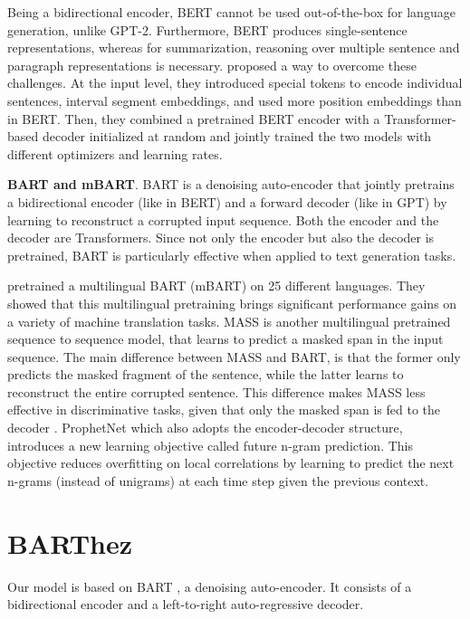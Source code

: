 \documentclass[11pt,a4paper]{article}
\begin{document}
Being a bidirectional encoder, BERT cannot be used out-of-the-box for language generation, unlike GPT-2.
Furthermore, BERT produces single-sentence representations, whereas for summarization, reasoning over multiple sentence and paragraph representations is necessary.
\citet{liu2019text} proposed a way to overcome these challenges.
At the input level, they introduced special tokens to encode individual sentences, interval segment embeddings, and used more position embeddings than in BERT.
Then, they combined a pretrained BERT encoder with a Transformer-based decoder initialized at random and jointly trained the two models with different optimizers and learning rates.

\noindent \textbf{BART and mBART}.
BART \cite{lewis2019bart} is a denoising auto-encoder that jointly pretrains a bidirectional encoder (like in BERT) and a forward decoder (like in GPT) by learning to reconstruct a corrupted input sequence.
Both the encoder and the decoder are Transformers.
Since not only the encoder but also the decoder is pretrained, BART is particularly effective when applied to text generation tasks.

\citet{liu2020multilingual} pretrained a multilingual BART (mBART) on 25 different languages.
They showed that this multilingual pretraining brings significant performance gains on a variety of machine translation tasks. 
MASS \cite{song2019mass} is another multilingual pretrained sequence to sequence model, that learns to predict a masked span in the input sequence.
The main difference between MASS and BART, is that the former only predicts the masked fragment of the sentence, while the latter learns to reconstruct the entire corrupted sentence.
This difference makes MASS less effective in discriminative tasks, given that only the masked span is fed to the decoder \cite{lewis2019bart}.
ProphetNet \cite{yan2020prophetnet} which also adopts the encoder-decoder structure, introduces a new learning objective called future n-gram prediction. This objective reduces overfitting on local correlations by learning to predict the next n-grams (instead of unigrams) at each time step given the previous context.

\section{BARThez} \label{sec:barthez}
Our model is based on BART \citep{lewis2019bart}, a denoising auto-encoder.
It consists of a bidirectional encoder and a left-to-right auto-regressive decoder.
\end{document}
